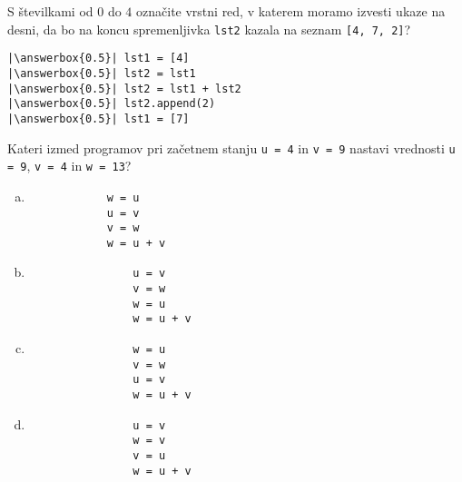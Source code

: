 \documentclass[arhiv, 10pt]{../izpit}
\newcommand{\inlinepy}[1]{\texttt{#1}}
\newcommand{\answerbox}[1]{\framebox{\vphantom{\large M}\hspace{#1cm}}}
\begin{document}
        \naloga*
        \begin{multicols}{2}
        \noindent 
        S številkami od $0$ do $4$ označite vrstni red, v katerem moramo izvesti ukaze na desni, da bo na koncu spremenljivka \inlinepy{lst2} kazala na seznam \inlinepy{[4, 7, 2]}?
    
        \columnbreak
        \noindent
        \begin{verbatim}
|\answerbox{0.5}| lst1 = [4]
|\answerbox{0.5}| lst2 = lst1
|\answerbox{0.5}| lst2 = lst1 + lst2
|\answerbox{0.5}| lst2.append(2)
|\answerbox{0.5}| lst1 = [7]

        \end{verbatim}
        \end{multicols}
    
            
        \naloga*
        
        Kateri izmed programov pri začetnem stanju
            \inlinepy{u = 4} in
            \inlinepy{v = 9}
        nastavi vrednosti
            \inlinepy{u = 9},
            \inlinepy{v = 4} in
            \inlinepy{w = 13}?
    
        \begin{multicols}{4}
        \begin{enumerate}[(a)]
\item 
            \begin{verbatim}
            w = u
            u = v
            v = w
            w = u + v
            \end{verbatim}
        
\item 
                \begin{verbatim}
                u = v
                v = w
                w = u
                w = u + v
                \end{verbatim}
            
\item 
                \begin{verbatim}
                w = u
                v = w
                u = v
                w = u + v
                \end{verbatim}
            
\item 
                \begin{verbatim}
                u = v
                w = v
                v = u
                w = u + v
                \end{verbatim}
            
\end{enumerate}

        \end{multicols}
    
\end{document}

